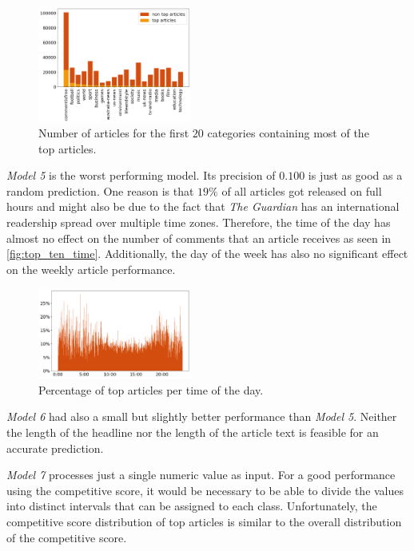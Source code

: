 \begin{figure}[h]
	\includegraphics[width=0.45\textwidth]{fig/top_ten_category.png}
	\caption{\textmd{Number of articles for the first $20$ categories containing most of the top articles.}}
	\label{fig:top_ten_category}
\end{figure}

\textit{Model 5} is the worst performing model. Its precision of $0.100$ is just as good as a random prediction.
One reason is that $19\%$ of all articles got released on full hours and might also be due to the fact that \textit{The Guardian} has an international readership spread over multiple time zones. 
Therefore, the time of the day has almost no effect on the number of comments that an article receives as seen in \autoref{fig:top_ten_time}. 
Additionally, the day of the week has also no significant effect on the weekly article performance. 

\begin{figure}[h]
	\includegraphics[width=0.45\textwidth]{fig/top_ten_time.png}
	\caption{\textmd{Percentage of top articles per time of the day.}}
	\label{fig:top_ten_time}
\end{figure}

\textit{Model 6} had also a small but slightly better performance than \textit{Model 5}. 
Neither the length of the headline nor the length of the article text is feasible for an accurate prediction.

\textit{Model 7} processes just a single numeric value as input. For a good performance using the competitive score, it would be necessary to be able to divide the values into distinct intervals that can be assigned to each class.
Unfortunately, the competitive score distribution of top articles is similar to the overall distribution of the competitive score.

